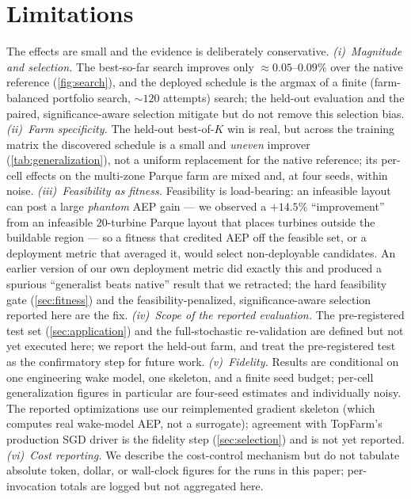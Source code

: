 \documentclass[11pt]{article}
\begin{document}
\section{Limitations}
\label{sec:limitations}
The effects are small and the evidence is deliberately conservative.
\emph{(i)~Magnitude and selection.} The best-so-far search improves only
$\approx\!0.05$--$0.09\%$ over the native reference (\cref{fig:search}), and the deployed
schedule is the argmax of a finite (farm-balanced portfolio search, $\sim\!120$
attempts) search; the held-out evaluation
and the paired, significance-aware selection mitigate but do not remove this selection
bias. \emph{(ii)~Farm specificity.} The held-out best-of-$K$ win is real, but across the
training matrix the discovered schedule is a small and \emph{uneven} improver
(\cref{tab:generalization}), not a uniform replacement for the native reference; its
per-cell effects on the multi-zone Parque farm are mixed and, at four seeds, within
noise.
\emph{(iii)~Feasibility as fitness.} Feasibility is load-bearing: an infeasible layout can
post a large \emph{phantom} AEP gain --- we observed a $+14.5\%$ ``improvement'' from an
infeasible $20$-turbine Parque layout that places turbines outside the buildable region
--- so a fitness that credited AEP off the feasible set, or a deployment metric that
averaged it, would select non-deployable candidates. An earlier version of our own
deployment metric did exactly this and produced a spurious ``generalist beats native''
result that we retracted; the hard feasibility gate (\cref{sec:fitness}) and the
feasibility-penalized, significance-aware selection reported here are the fix.
\emph{(iv)~Scope of the reported evaluation.} The pre-registered test set
(\cref{sec:application}) and the full-stochastic re-validation are defined but not yet
executed here; we report the held-out farm, and treat the pre-registered test
as the confirmatory step for future work. \emph{(v)~Fidelity.} Results are conditional on
one engineering wake model, one skeleton, and a finite seed budget; per-cell
generalization figures in particular are four-seed estimates and individually noisy. The
reported optimizations use our reimplemented gradient skeleton (which computes real
wake-model AEP, not a surrogate); agreement with TopFarm's production SGD driver is the
fidelity step (\cref{sec:selection}) and is not yet reported. \emph{(vi)~Cost reporting.}
We describe the cost-control mechanism but do not tabulate absolute token, dollar, or
wall-clock figures for the runs in this paper; per-invocation totals are logged but not
aggregated here.
\end{document}

